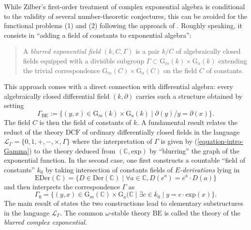 \documentclass[12pt]{amsart}
\newcommand{\DCF}{\mathrm{DCF}}
\newcommand{\BE}{\mathrm{BE}}
\theoremstyle{definition}
\theoremstyle{plain}
\theoremstyle{exampstyle}\newtheorem{thmx}{Theorem}
\theoremstyle{exampstyle}\newtheorem{thmxbis}{Theorem}
\newcommand{\Gm}{\mathrm{G}_m}
\newcommand{\Ga}{\mathrm{G}_a}
\begin{document}
While Zilber's first-order treatment of complex exponential algebra is conditional to the validity of several number-theoretic conjectures, this can be avoided for the functional problems (1) and (2) following the approach of \cite{Kirby-semiab, Kirby-blurred}. Roughly speaking, it consists in ``adding a field of constants  to exponential algebra'':
\begin{quote}
 A {\em blurred exponential field} $(k,C,\Gamma)$ is a pair $k/C$  of algebraically closed fields equipped with a divisible subgroup $\Gamma \subset \Gm(k) \times \Ga(k)$   extending the trivial correspondence $\Gm(C) \times \Ga(C)$ on the field $C$ of  constants.
\end{quote}
This approach comes with a direct connection with differential algebra: every algebraically closed differential field $(k,\partial)$ carries such a structure obtained by setting 
\begin{equation}\label{equation-intro-Gamma}
 \Gamma_\mathrm{BE} := \lbrace (y,x) \in \Gm(k) \times \Ga(k) \mid \partial(y)/y = \partial(x) \rbrace.
 \end{equation}
The field $C$ is then the field of constants of $k$. A fundamental result relates the reduct of the theory $\DCF$ of ordinary differentially closed fields in the language $\mathcal L_\Gamma = \lbrace 0,1,+,-,\times, \Gamma \rbrace$ where the interpretation of $\Gamma$ is given by (\ref{equation-intro-Gamma}) to the theory deduced from  $(\mathbb{C}, \mathrm{exp})$ by ``blurring'' the graph of the exponential function. In the second case, one first constructs a countable ``field of constants'' $k_0$ by taking intersection of constants fields of {\em $E$-derivations} lying in
$$ \mathrm{EDer}(\mathbb{C}) = \lbrace D \in \mathrm{Der}(\mathbb{C}) \mid \forall a \in \mathbb{C}, D(e^{a}) = e^{a} \cdot D(a) \rbrace$$
and then interprets the correspondence $\Gamma$ as
$$ \Gamma_0 = \lbrace (y,x) \in \Gm(\mathbb{C}) \times \Ga(\mathbb{C} \mid \exists c \in k_0 \mid y = c \cdot \mathrm{exp}(x) \rbrace.$$
The main result of \cite{Kirby-blurred} states the two constructions lead to elementary substructures in the language $\mathcal L_\Gamma$. The common $\omega$-stable theory $\BE$ is called the theory of the {\em blurred complex exponential}. 
\end{document}

